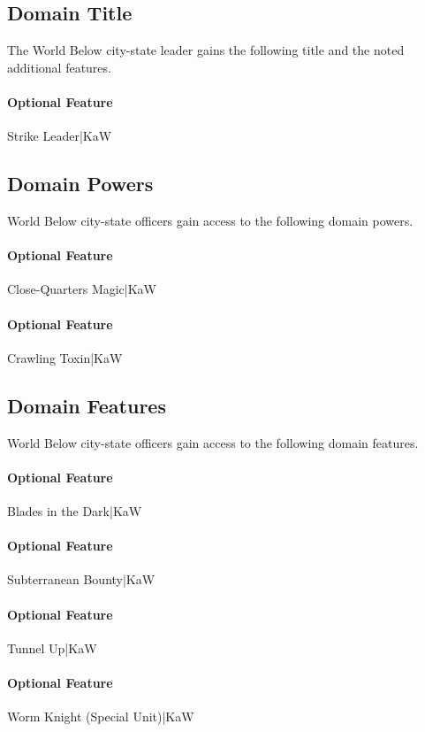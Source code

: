 \documentclass[10pt,a4paper,twoside,bg=print,twocolumn,openany,nodeprecatedcode]{dndbook}
\begin{document}
\subsection{Domain Title}
The World Below city-state leader gains the following title and the noted additional features.

\paragraph{Optional Feature}
Strike Leader|KaW

\subsection{Domain Powers}
World Below city-state officers gain access to the following domain powers.

\paragraph{Optional Feature}
Close-Quarters Magic|KaW

\paragraph{Optional Feature}
Crawling Toxin|KaW

\subsection{Domain Features}
World Below city-state officers gain access to the following domain features.

\paragraph{Optional Feature}
Blades in the Dark|KaW

\paragraph{Optional Feature}
Subterranean Bounty|KaW

\paragraph{Optional Feature}
Tunnel Up|KaW

\paragraph{Optional Feature}
Worm Knight (Special Unit)|KaW
\end{document}
